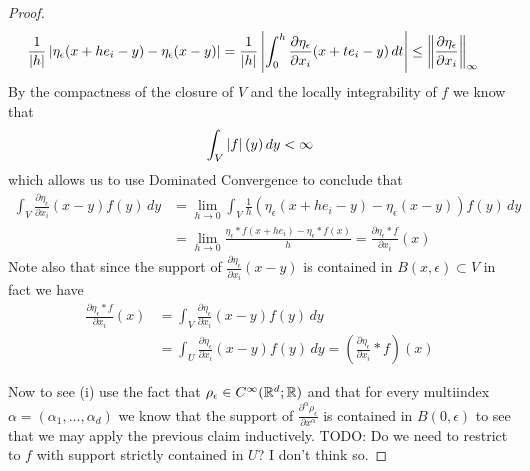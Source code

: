 \begin{proof}
\begin{align*}
\frac{1}{\left \vert h \right \vert} \left \vert \eta_\epsilon(x+he_i-y)- \eta_\epsilon(x-y) \right \vert 
&= \frac{1}{\left \vert h \right \vert} \left \vert \int_0^h \frac{\partial \eta_\epsilon}{\partial x_i}(x + te_i - y) \, dt \right \vert 
\leq \left \lVert \frac{\partial \eta_\epsilon}{\partial x_i} \right \rVert_\infty 
\end{align*}
By the compactness of the closure of $V$ and the locally integrability of $f$ we know that 
\begin{align*}
\int_{V} \left \vert f \right \vert(y) \, dy < \infty
\end{align*}
which allows us to use Dominated Convergence to conclude that
\begin{align*}
\int_V \frac{\partial \eta_\epsilon}{\partial x_i}(x-y) f(y) \, dy &= \lim_{h \to 0} \int_{V } \frac{1}{h} \left (\eta_\epsilon(x+he_i-y)- \eta_\epsilon(x-y) \right ) f(y) \, dy \\
&=\lim_{h \to 0} \frac{\eta_\epsilon \ast f(x+he_i) - \eta_\epsilon \ast f(x)}{h} = \frac{\partial \eta_\epsilon \ast f}{\partial x_i}(x)
\end{align*}
Note also that since the support of $\frac{\partial \eta_\epsilon}{\partial x_i}(x-y)$ is contained in $B(x, \epsilon) \subset V$ in fact we have 
\begin{align*}
\frac{\partial \eta_\epsilon \ast f}{\partial x_i}(x) &= \int_V \frac{\partial \eta_\epsilon}{\partial x_i}(x-y) f(y) \, dy \\
&=\int_U \frac{\partial \eta_\epsilon}{\partial x_i}(x-y) f(y) \, dy = \left(\frac{\partial \eta_\epsilon}{\partial x_i} \ast f \right) (x)
\end{align*}

Now to see (i) use the fact that $\rho_\epsilon \in C^\infty(\mathbb{R}^d; \mathbb{R})$ and that for every multiindex $\alpha=(\alpha_1, \dotsc, \alpha_d)$ we know that the support of $\frac{\partial^\alpha \rho_\epsilon}{\partial x^\alpha}$ is contained in $B(0,\epsilon)$ to see that we may apply the previous claim inductively.
TODO: Do we need to restrict to $f$ with support strictly contained in $U$?  I don't think so.


\end{proof}
